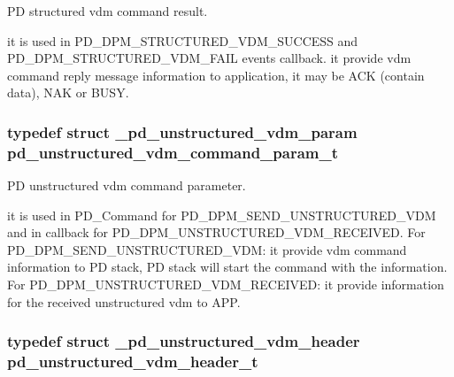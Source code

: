 P\-D structured vdm command result. 

it is used in P\-D\-\_\-\-D\-P\-M\-\_\-\-S\-T\-R\-U\-C\-T\-U\-R\-E\-D\-\_\-\-V\-D\-M\-\_\-\-S\-U\-C\-C\-E\-S\-S and P\-D\-\_\-\-D\-P\-M\-\_\-\-S\-T\-R\-U\-C\-T\-U\-R\-E\-D\-\_\-\-V\-D\-M\-\_\-\-F\-A\-I\-L events callback. it provide vdm command reply message information to application, it may be A\-C\-K (contain data), N\-A\-K or B\-U\-S\-Y. \hypertarget{group__usb__pd__stack_ga353c18d85300f7ee60dab2241f2e1310}{
\subsubsection[{pd\-\_\-unstructured\-\_\-vdm\-\_\-command\-\_\-param\-\_\-t}]{\setlength{\rightskip}{0pt plus 5cm}typedef struct {\bf \-\_\-pd\-\_\-unstructured\-\_\-vdm\-\_\-param}  {\bf pd\-\_\-unstructured\-\_\-vdm\-\_\-command\-\_\-param\-\_\-t}}}\label{group__usb__pd__stack_ga353c18d85300f7ee60dab2241f2e1310}


P\-D unstructured vdm command parameter. 

it is used in P\-D\-\_\-\-Command for P\-D\-\_\-\-D\-P\-M\-\_\-\-S\-E\-N\-D\-\_\-\-U\-N\-S\-T\-R\-U\-C\-T\-U\-R\-E\-D\-\_\-\-V\-D\-M and in callback for P\-D\-\_\-\-D\-P\-M\-\_\-\-U\-N\-S\-T\-R\-U\-C\-T\-U\-R\-E\-D\-\_\-\-V\-D\-M\-\_\-\-R\-E\-C\-E\-I\-V\-E\-D. For P\-D\-\_\-\-D\-P\-M\-\_\-\-S\-E\-N\-D\-\_\-\-U\-N\-S\-T\-R\-U\-C\-T\-U\-R\-E\-D\-\_\-\-V\-D\-M\-: it provide vdm command information to P\-D stack, P\-D stack will start the command with the information. For P\-D\-\_\-\-D\-P\-M\-\_\-\-U\-N\-S\-T\-R\-U\-C\-T\-U\-R\-E\-D\-\_\-\-V\-D\-M\-\_\-\-R\-E\-C\-E\-I\-V\-E\-D\-: it provide information for the received unstructured vdm to A\-P\-P. \hypertarget{group__usb__pd__stack_ga8e40e5f802e7758a04876e59a137c3b1}{
\subsubsection[{pd\-\_\-unstructured\-\_\-vdm\-\_\-header\-\_\-t}]{\setlength{\rightskip}{0pt plus 5cm}typedef struct {\bf \-\_\-pd\-\_\-unstructured\-\_\-vdm\-\_\-header}  {\bf pd\-\_\-unstructured\-\_\-vdm\-\_\-header\-\_\-t}}}\label{group__usb__pd__stack_ga8e40e5f802e7758a04876e59a137c3b1}


